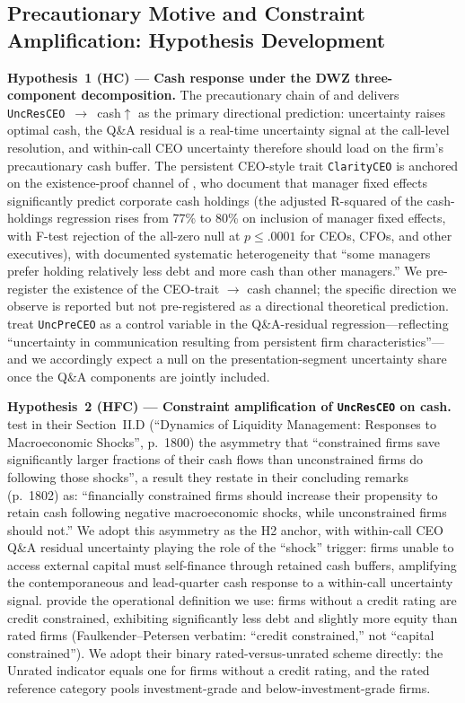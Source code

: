 \subsection{Precautionary Motive and Constraint Amplification: Hypothesis Development}
\label{sec:framework:precautionary}

\textbf{Hypothesis~1 (HC) — Cash response under the DWZ three-component decomposition.} The precautionary chain of \citeauthor{opler1999} and \citeauthor{bates2009} delivers \texttt{UncResCEO}~$\to$~cash$\uparrow$ as the primary directional prediction: uncertainty raises optimal cash, the Q\&A residual is a real-time uncertainty signal at the call-level resolution, and within-call CEO uncertainty therefore should load on the firm's precautionary cash buffer. The persistent CEO-style trait \texttt{ClarityCEO} is anchored on the existence-proof channel of , who document that manager fixed effects significantly predict corporate cash holdings (the adjusted R-squared of the cash-holdings regression rises from 77\% to 80\% on inclusion of manager fixed effects, with F-test rejection of the all-zero null at $p \le .0001$ for CEOs, CFOs, and other executives), with documented systematic heterogeneity that ``some managers prefer holding relatively less debt and more cash than other managers.'' We pre-register the existence of the CEO-trait $\to$ cash channel; the specific direction we observe is reported but not pre-registered as a directional theoretical prediction. \citeauthor{dzielinski2021} treat \texttt{UncPreCEO} as a control variable in the Q\&A-residual regression---reflecting ``uncertainty in communication resulting from persistent firm characteristics''---and we accordingly expect a null on the presentation-segment uncertainty share once the Q\&A components are jointly included.

\textbf{Hypothesis~2 (HFC) — Constraint amplification of \texttt{UncResCEO} on cash.}  test in their Section~II.D (``Dynamics of Liquidity Management: Responses to Macroeconomic Shocks'', p.~1800) the asymmetry that ``constrained firms save significantly larger fractions of their cash flows than unconstrained firms do following those shocks'', a result they restate in their concluding remarks (p.~1802) as: ``financially constrained firms should increase their propensity to retain cash following negative macroeconomic shocks, while unconstrained firms should not.'' We adopt this asymmetry as the H2 anchor, with within-call CEO Q\&A residual uncertainty playing the role of the ``shock'' trigger: firms unable to access external capital must self-finance through retained cash buffers, amplifying the contemporaneous and lead-quarter cash response to a within-call uncertainty signal.  provide the operational definition we use: firms without a credit rating are credit constrained, exhibiting significantly less debt and slightly more equity than rated firms (Faulkender--Petersen verbatim: ``credit constrained,'' not ``capital constrained''). We adopt their binary rated-versus-unrated scheme directly: the Unrated indicator equals one for firms without a credit rating, and the rated reference category pools investment-grade and below-investment-grade firms.

